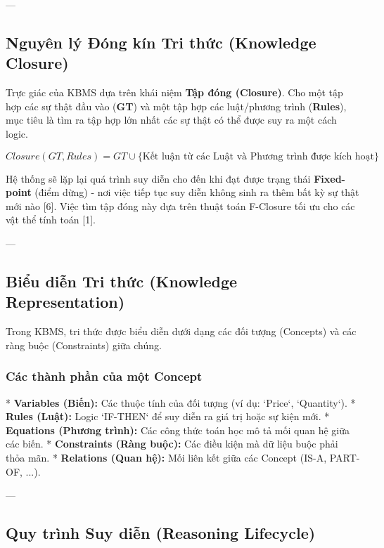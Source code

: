 ---

\subsection{Nguyên lý Đóng kín Tri thức (Knowledge Closure)}

Trực giác của KBMS dựa trên khái niệm \textbf{Tập đóng (Closure)}. Cho một tập hợp các sự thật đầu vào (\textbf{GT}) và một tập hợp các luật/phương trình (\textbf{Rules}), mục tiêu là tìm ra tập hợp lớn nhất các sự thật có thể được suy ra một cách logic.

\begin{equation}
Closure(GT, Rules) = GT \cup \{ \text{Kết luận từ các Luật và Phương trình được kích hoạt} \}
\end{equation}

Hệ thống sẽ lặp lại quá trình suy diễn cho đến khi đạt được trạng thái \textbf{Fixed-point} (điểm dừng) - nơi việc tiếp tục suy diễn không sinh ra thêm bất kỳ sự thật mới nào [6]. Việc tìm tập đóng này dựa trên thuật toán F-Closure tối ưu cho các vật thể tính toán [1].

---

\subsection{Biểu diễn Tri thức (Knowledge Representation)}

Trong KBMS, tri thức được biểu diễn dưới dạng các đối tượng (Concepts) và các ràng buộc (Constraints) giữa chúng.

\subsubsection{Các thành phần của một Concept}
*   \textbf{Variables (Biến):} Các thuộc tính của đối tượng (ví dụ: `Price`, `Quantity`).
*   \textbf{Rules (Luật):} Logic `IF-THEN` để suy diễn ra giá trị hoặc sự kiện mới.
*   \textbf{Equations (Phương trình):} Các công thức toán học mô tả mối quan hệ giữa các biến.
*   \textbf{Constraints (Ràng buộc):} Các điều kiện mà dữ liệu buộc phải thỏa mãn.
*   \textbf{Relations (Quan hệ):} Mối liên kết giữa các Concept (IS-A, PART-OF, ...).

---

\subsection{Quy trình Suy diễn (Reasoning Lifecycle)}

